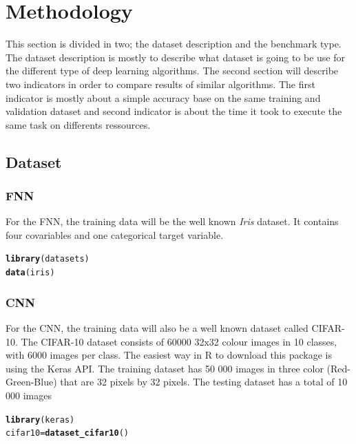 \documentclass[6pt,letter]{article}\usepackage[]{graphicx}\usepackage[]{color}
\makeatletter
\newcommand{\hlstd}[1]{\textcolor[rgb]{0.345,0.345,0.345}{#1}}%
\newcommand{\hlkwb}[1]{\textcolor[rgb]{0.69,0.353,0.396}{#1}}%
\newcommand{\hlkwd}[1]{\textcolor[rgb]{0.737,0.353,0.396}{\textbf{#1}}}%
\newenvironment{kframe}{%
 \def\at@end@of@kframe{}%
 \ifinner\ifhmode%
  \def\at@end@of@kframe{\end{minipage}}%
  \begin{minipage}{\columnwidth}%
 \fi\fi%
 \def\FrameCommand##1{\hskip\@totalleftmargin \hskip-\fboxsep
 \colorbox{shadecolor}{##1}\hskip-\fboxsep
     \hskip-\linewidth \hskip-\@totalleftmargin \hskip\columnwidth}%
 \MakeFramed {\advance\hsize-\width
   \@totalleftmargin\z@ \linewidth\hsize
   \@setminipage}}%
 {\par\unskip\endMakeFramed%
 \at@end@of@kframe}
\newenvironment{knitrout}{}{} %
\makeatother
\begin{document}
\section{Methodology}
This section is divided in two;  the dataset description and the benchmark type. The dataset description is mostly to describe what dataset is going to be use for the different type of deep learning algorithms. The second section will describe two indicators in order to compare results of similar algorithms. The first indicator is mostly about a simple accuracy base on the same training and validation dataset and second indicator is about the time it took to execute the same task on differents ressources.
\subsection{Dataset}
\subsubsection{FNN}
For the FNN, the training data will be the well known \textit{Iris} dataset. It contains four covariables and one categorical target variable.
\begin{knitrout}
\color{fgcolor}\begin{kframe}
\begin{alltt}
\hlkwd{library}\hlstd{(datasets)}
\hlkwd{data}\hlstd{(iris)}
\end{alltt}
\end{kframe}
\end{knitrout}

\subsubsection{CNN}
For the CNN, the training data will also be a well known dataset called CIFAR-10. The CIFAR-10 dataset consists of 60000 32x32 colour images in 10 classes, with 6000 images per class. The easiest way in R to download this package is using the Keras API. The training dataset has 50 000 images in three color (Red-Green-Blue) that are 32 pixels by 32 pixels. The testing dataset has a total of 10 000 images
\begin{knitrout}
\color{fgcolor}\begin{kframe}
\begin{alltt}
\hlkwd{library}\hlstd{(keras)}
\hlstd{cifar10} \hlkwb{=} \hlkwd{dataset_cifar10}\hlstd{()}
\end{alltt}
\end{kframe}
\end{knitrout}
\end{document}

